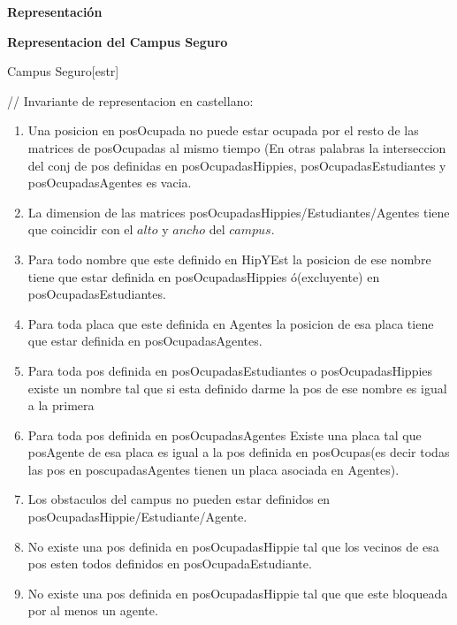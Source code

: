 \documentclass[a4paper,10pt]{article}
\newenvironment{Representacion}{%
  \vspace*{2ex}%
  \noindent\textbf{\Large Representación}%
  \vspace*{2ex}%
}{}
\newcommand{\Titulo}[1]{
 \vspace*{1ex}\par\noindent\textbf{\large #1}\par
}
\begin{document}
\begin{Representacion}
 
 \Titulo{Representacion del Campus Seguro}
\begin{Estructura}{Campus Seguro}[estr]
   \begin{Tupla}[estr]
   \end{Tupla}
 \end{Estructura}
  //
  Invariante de representacion en castellano:
 \begin{enumerate}
 
 \item Una posicion en posOcupada no puede estar ocupada por el resto de las matrices de posOcupadas  al mismo tiempo (En otras palabras la interseccion del conj de pos definidas en posOcupadasHippies, posOcupadasEstudiantes y posOcupadasAgentes es vacia.
 \item La dimension de las matrices posOcupadasHippies/Estudiantes/Agentes tiene que coincidir con el $alto$ y $ancho$ del $campus$.
 \item Para todo nombre que este definido en HipYEst la posicion de ese nombre tiene que estar definida en posOcupadasHippies ó(excluyente) en posOcupadasEstudiantes.
 \item Para toda placa que este definida en Agentes la posicion de esa placa tiene que estar definida en posOcupadasAgentes.
 \item Para toda pos definida en posOcupadasEstudiantes o posOcupadasHippies existe un nombre tal que si esta definido darme la pos de ese nombre es igual a la primera
 \item Para toda pos definida en posOcupadasAgentes Existe una placa tal que posAgente de esa placa es igual a la pos definida en posOcupas(es decir todas las pos en poscupadasAgentes tienen un placa asociada en Agentes).
 \item Los obstaculos del campus no pueden estar definidos en posOcupadasHippie/Estudiante/Agente.
 \item No existe una pos definida en posOcupadasHippie  tal que los vecinos de esa pos esten todos definidos en posOcupadaEstudiante.
 \item No existe una pos definida en posOcupadasHippie  tal que que este bloqueada por al menos un agente.
 

\end{enumerate}
\end{Representacion}
\end{document}
